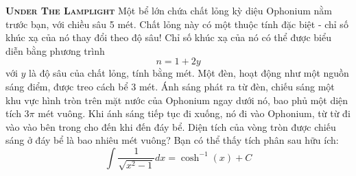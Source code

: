 
\begin{problem}
	{\textbf{\textsc{Under The Lamplight}}} Một bể lớn chứa chất lỏng kỳ diệu Ophonium nằm trước bạn, với chiều sâu 5 mét. Chất lỏng này có một thuộc tính đặc biệt - chỉ số khúc xạ của nó thay đổi theo độ sâu! Chỉ số khúc xạ của nó có thể được biểu diễn bằng phương trình $$n = 1 + 2y$$ với $y$ là độ sâu của chất lỏng, tính bằng mét. Một đèn, hoạt động như một nguồn sáng điểm, được treo cách bể 3 mét. Ánh sáng phát ra từ đèn, chiếu sáng một khu vực hình tròn trên mặt nước của Ophonium ngay dưới nó, bao phủ một diện tích $3\pi$ mét vuông. Khi ánh sáng tiếp tục đi xuống, nó đi vào Ophonium, từ từ đi vào vào bên trong cho đến khi đến đáy bể. Diện tích của vòng tròn được chiếu sáng ở đáy bể là bao nhiêu mét vuông? Bạn có thể thấy tích phân sau hữu ích:
	$$\int\frac{1}{\sqrt{x^2-1}}dx = \cosh^{-1}(x) + C$$
\end{problem}